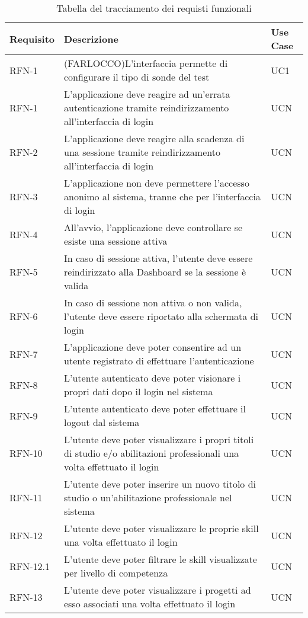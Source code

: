 \begin{table}%
\caption{Tabella del tracciamento dei requisti funzionali}
\label{tab:requisiti-funzionali}
\begin{tabularx}{\textwidth}{lXl}
\hline\hline
\textbf{Requisito} & \textbf{Descrizione} & \textbf{Use Case}\\
\hline
RFN-1     & (FARLOCCO)L'interfaccia permette di configurare il tipo di sonde del test & UC1 \\
\hline
RFN-1 & L'applicazione deve reagire ad un'errata autenticazione tramite reindirizzamento all'interfaccia di login & UCN \\
\hline
RFN-2 & L'applicazione deve reagire alla scadenza di una sessione tramite reindirizzamento all'interfaccia di login & UCN \\
\hline
RFN-3 & L'applicazione non deve permettere l'accesso anonimo al sistema, tranne che per l'interfaccia di login & UCN \\
\hline
RFN-4 & All'avvio, l'applicazione deve controllare se esiste una sessione attiva & UCN \\
\hline
RFN-5 & In caso di sessione attiva, l'utente deve essere reindirizzato alla Dashboard se la sessione è valida & UCN \\
\hline
RFN-6 & In caso di sessione non attiva o non valida, l'utente deve essere riportato alla schermata di login & UCN \\
\hline
RFN-7 & L'applicazione deve poter consentire ad un utente registrato di effettuare l'autenticazione & UCN \\
\hline
RFN-8 & L'utente autenticato deve poter visionare i propri dati dopo il login nel sistema & UCN \\
\hline
RFN-9 & L'utente autenticato deve poter effettuare il logout dal sistema & UCN \\
\hline
RFN-10 & L'utente deve poter visualizzare i propri titoli di studio e/o abilitazioni professionali una volta effettuato il login & UCN \\
\hline
RFN-11 & L'utente deve poter inserire un nuovo titolo di studio o un'abilitazione professionale nel sistema & UCN \\
\hline
RFN-12 & L'utente deve poter visualizzare le proprie skill una volta effettuato il login & UCN \\
\hline
RFN-12.1 & L'utente deve poter filtrare le skill visualizzate per livello di competenza & UCN \\
\hline
RFN-13 & L'utente deve poter visualizzare i progetti ad esso associati una volta effettuato il login & UCN \\

\end{tabularx}
\end{table}
